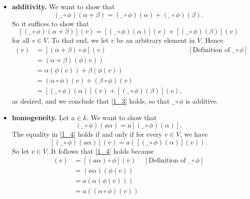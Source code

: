 \documentclass[9pt]{article}
\begin{document}
\begin{enumerate}
      \begin{itemize}
         \item \textbf{additivity.} We want to show that
               \begin{equation} \label{1_3}
                  (\_\circ\phi)(\alpha+\beta) = (\_\circ\phi)(\alpha) +
                  (\_\circ\phi)(\beta).
               \end{equation}
               So it suffices to show that
               $$[(\_\circ\phi)(\alpha+\beta)](v) = [(\_\circ\phi)(\alpha)](v) +
                 [(\_\circ\phi)(\beta)](v)$$
               for all $v \in V$. To that end, we let $v$ be an arbitrary
               element in $V$. Hence
               \begin{align*}
                  [(\_\circ\phi)(\alpha+\beta)](v) &=
                     [(\alpha+\beta)\circ\phi](v)
                        &[\text{Definition of }\_\circ\phi ] \\
                     &= (\alpha + \beta)(\phi(v)) \\
                     &= \alpha(\phi(v)) + \beta(\phi(v)) \\
                     &= (\alpha\circ\phi)(v) + (\beta\circ\phi)(v) \\
                     &= [(\_\circ\phi)(\alpha)](v) + [(\_\circ\phi)(\beta)](v),
               \end{align*}
               as desired, and we conclude that \eqref{1_3} holds, so that
               $\_\circ\phi$ is additive.
         \item \textbf{homogeneity.} Let $a \in k$. We want to show that
               \begin{equation} \label{1_4}
                  (\_\circ\phi)(a\alpha) = a[(\_\circ\phi)(\alpha)].
               \end{equation}
               The equality in \eqref{1_4} holds if and only if for every
               $v \in V$, we have
               $$[(\_\circ\phi)(a\alpha)](v) = a([(\_\circ\phi)(\alpha)](v)).$$
               So let $v \in V$. It follows that \eqref{1_4} holds because
               \begin{align*}
                  [(\_\circ\phi)(a\alpha)](v) &= [(a\alpha)\circ\phi](v)
                     &[\text{Definition of }\_\circ\phi ] \\
                     &= (a\alpha)(\phi(v)) \\
                     &= a(\alpha(\phi(v))) \\
                     &= a((\alpha\circ\phi)(v)) \\

\end{align*}
\end{itemize}
\end{enumerate}
\end{document}
